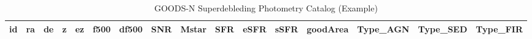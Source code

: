\begin{table*}

\begin{center}

\caption{ %
    GOODS-N Superdebleding Photometry Catalog (Example) %
    \label{Table_3} %
}

\begin{tabular}{ cccccccccccccccc }

    \hline

        id & 
        ra & 
        de & 
        z & 
        ez & 
        f500 & 
        df500 & 
        SNR & 
        Mstar & 
        SFR & 
        eSFR & 
        sSFR & 
        goodArea & 
        Type_AGN & 
        Type_SED & 
        Type_FIR \\ 
    
    \hline


\end{tabular}
\end{center}
\end{table*}
